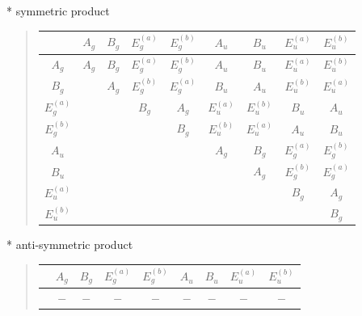 \documentclass[fleqn,8pt,landscape]{jsarticle}
\begin{document}
* symmetric product
\begin{quote}
\begin{tabular}{c|cccccccc} \hline \hline
 & $ A_{g} $ & $ B_{g} $ & $ E_{g}^{(a)} $ & $ E_{g}^{(b)} $ & $ A_{u} $ & $ B_{u} $ & $ E_{u}^{(a)} $ & $ E_{u}^{(b)} $ \\ \hline
$ A_{g} $ & $ A_{g} $ & $ B_{g} $ & $ E_{g}^{(a)} $ & $ E_{g}^{(b)} $ & $ A_{u} $ & $ B_{u} $ & $ E_{u}^{(a)} $ & $ E_{u}^{(b)} $ \\
$ B_{g} $ & $  $ & $ A_{g} $ & $ E_{g}^{(b)} $ & $ E_{g}^{(a)} $ & $ B_{u} $ & $ A_{u} $ & $ E_{u}^{(b)} $ & $ E_{u}^{(a)} $ \\
$ E_{g}^{(a)} $ & $  $ & $  $ & $ B_{g} $ & $ A_{g} $ & $ E_{u}^{(a)} $ & $ E_{u}^{(b)} $ & $ B_{u} $ & $ A_{u} $ \\
$ E_{g}^{(b)} $ & $  $ & $  $ & $  $ & $ B_{g} $ & $ E_{u}^{(b)} $ & $ E_{u}^{(a)} $ & $ A_{u} $ & $ B_{u} $ \\
$ A_{u} $ & $  $ & $  $ & $  $ & $  $ & $ A_{g} $ & $ B_{g} $ & $ E_{g}^{(a)} $ & $ E_{g}^{(b)} $ \\
$ B_{u} $ & $  $ & $  $ & $  $ & $  $ & $  $ & $ A_{g} $ & $ E_{g}^{(b)} $ & $ E_{g}^{(a)} $ \\
$ E_{u}^{(a)} $ & $  $ & $  $ & $  $ & $  $ & $  $ & $  $ & $ B_{g} $ & $ A_{g} $ \\
$ E_{u}^{(b)} $ & $  $ & $  $ & $  $ & $  $ & $  $ & $  $ & $  $ & $ B_{g} $ \\
 \hline \hline
\end{tabular}
\end{quote}

* anti-symmetric product
\begin{quote}
\begin{tabular}{ccccccccc} \hline \hline
 & $ A_{g} $ & $ B_{g} $ & $ E_{g}^{(a)} $ & $ E_{g}^{(b)} $ & $ A_{u} $ & $ B_{u} $ & $ E_{u}^{(a)} $ & $ E_{u}^{(b)} $ \\ \hline
$  $ & $ - $ & $ - $ & $ - $ & $ - $ & $ - $ & $ - $ & $ - $ & $ - $ \\
 \hline \hline
\end{tabular}
\end{quote}
\end{document}
